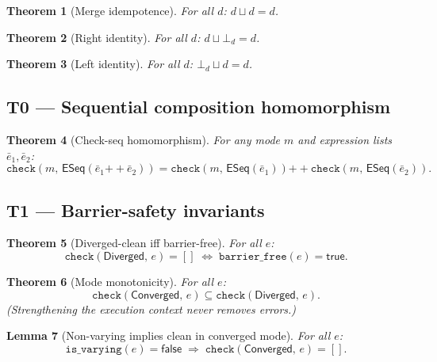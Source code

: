 \documentclass[11pt,a4paper]{article}
\theoremstyle{definition}
\theoremstyle{plain}
\newtheorem{theorem}{Theorem}[section]
\newtheorem{lemma}[theorem]{Lemma}
\theoremstyle{remark}
\newcommand{\Converged}{\mathsf{Converged}}
\newcommand{\Diverged}{\mathsf{Diverged}}
\newcommand{\chk}[2]{\mathtt{check}(#1,\,#2)}
\newcommand{\isvarying}[1]{\mathtt{is\_varying}(#1)}
\newcommand{\barrierfree}[1]{\mathtt{barrier\_free}(#1)}
\newcommand{\mergedim}{\mathbin{\sqcup}}
\newcommand{\emptydim}{\bot_d}
\newcommand{\incl}{\subseteq}
\begin{document}
\begin{theorem}[Merge idempotence]
  \label{thm:merge-idem}
  For all $d$: $d \mergedim d = d$.
\end{theorem}

\begin{theorem}[Right identity]
  \label{thm:merge-empty-r}
  For all $d$: $d \mergedim \emptydim = d$.
\end{theorem}

\begin{theorem}[Left identity]
  \label{thm:merge-empty-l}
  For all $d$: $\emptydim \mergedim d = d$.
\end{theorem}

\subsection{T0 --- Sequential composition homomorphism}

\begin{theorem}[Check-seq homomorphism]
  \label{thm:seqhom}
  For any mode $m$ and expression lists $\bar{e}_1, \bar{e}_2$:
  \[
    \chk{m}{\mathsf{ESeq}(\bar{e}_1 \mathbin{++} \bar{e}_2)}
    = \chk{m}{\mathsf{ESeq}(\bar{e}_1)} \mathbin{++} \chk{m}{\mathsf{ESeq}(\bar{e}_2)}.
  \]
\end{theorem}

\subsection{T1 --- Barrier-safety invariants}

\begin{theorem}[Diverged-clean iff barrier-free]
  \label{thm:div-clean}
  For all $e$:
  \[
    \chk{\Diverged}{e} = []
    \;\iff\;
    \barrierfree{e} = \mathsf{true}.
  \]
\end{theorem}

\begin{theorem}[Mode monotonicity]
  \label{thm:monotone}
  For all $e$:
  \[
    \chk{\Converged}{e} \incl \chk{\Diverged}{e}.
  \]
  (Strengthening the execution context never removes errors.)
\end{theorem}

\begin{lemma}[Non-varying implies clean in converged mode]
  \label{thm:nonvar-clean}
  For all $e$:
  \[
    \isvarying{e} = \mathsf{false}
    \;\Rightarrow\;
    \chk{\Converged}{e} = [].
  \]
\end{lemma}
\end{document}

